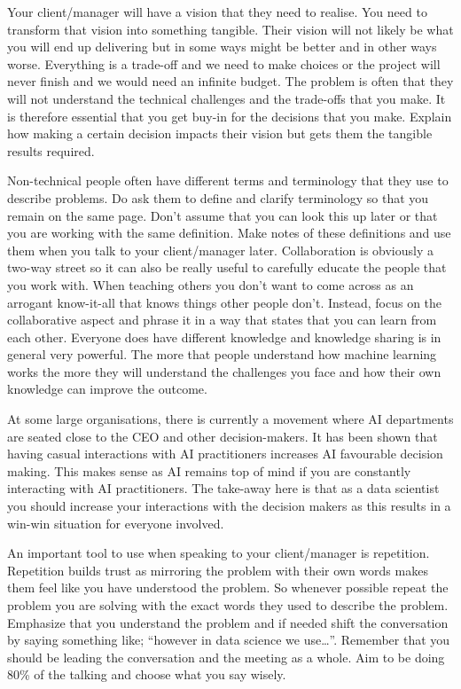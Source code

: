 \documentclass[
]{book}
\begin{document}
Your client/manager will have a vision that they need to realise. You
need to transform that vision into something tangible. Their vision will
not likely be what you will end up delivering but in some ways might be
better and in other ways worse. Everything is a trade-off and we need to
make choices or the project will never finish and we would need an
infinite budget. The problem is often that they will not understand the
technical challenges and the trade-offs that you make. It is therefore
essential that you get buy-in for the decisions that you make. Explain
how making a certain decision impacts their vision but gets them the
tangible results required.

Non-technical people often have different terms and terminology that
they use to describe problems. Do ask them to define and clarify
terminology so that you remain on the same page. Don't assume that you
can look this up later or that you are working with the same definition.
Make notes of these definitions and use them when you talk to your
client/manager later. Collaboration is obviously a two-way street so it
can also be really useful to carefully educate the people that you work
with. When teaching others you don't want to come across as an arrogant
know-it-all that knows things other people don't. Instead, focus on the
collaborative aspect and phrase it in a way that states that you can
learn from each other. Everyone does have different knowledge and
knowledge sharing is in general very powerful. The more that people
understand how machine learning works the more they will understand the
challenges you face and how their own knowledge can improve the outcome.

At some large organisations, there is currently a movement where AI
departments are seated close to the CEO and other decision-makers. It
has been shown that having casual interactions with AI practitioners
increases AI favourable decision making. This makes sense as AI remains
top of mind if you are constantly interacting with AI practitioners. The
take-away here is that as a data scientist you should increase your
interactions with the decision makers as this results in a win-win
situation for everyone involved.

An important tool to use when speaking to your client/manager is
repetition. Repetition builds trust as mirroring the problem with their
own words makes them feel like you have understood the problem. So
whenever possible repeat the problem you are solving with the exact
words they used to describe the problem. Emphasize that you understand
the problem and if needed shift the conversation by saying something
like; ``however in data science we use\ldots{}''. Remember that you
should be leading the conversation and the meeting as a whole. Aim to be
doing 80\% of the talking and choose what you say wisely.
\end{document}
